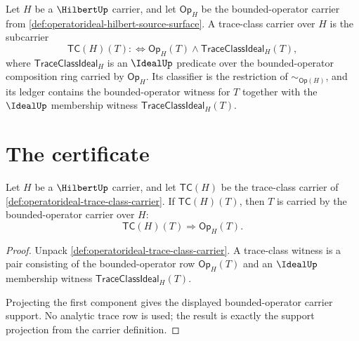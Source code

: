 \begin{definition}
\label{def:operatorideal-trace-class-carrier}
Let $H$ be a $\HilbertUp$ carrier, and let $\mathsf{Op}_H$ be the bounded-operator carrier from \autoref{def:operatorideal-hilbert-source-surface}. A trace-class carrier over $H$ is the subcarrier
$$
\mathsf{TC}(H)(T)
:\Longleftrightarrow
\mathsf{Op}_H(T)\land \mathsf{TraceClassIdeal}_H(T),
$$
where $\mathsf{TraceClassIdeal}_H$ is an $\IdealUp$ predicate over the bounded-operator composition ring carried by $\mathsf{Op}_H$. Its classifier is the restriction of $\sim_{\mathsf{Op}(H)}$, and its ledger contains the bounded-operator witness for $T$ together with the $\IdealUp$ membership witness $\mathsf{TraceClassIdeal}_H(T)$.
\end{definition}

\section{The certificate}
\label{sec:operatorideal-certificate}

\begin{theorem}
\label{thm:operatorideal-carrier-support-row}
Let $H$ be a $\HilbertUp$ carrier, and let $\mathsf{TC}(H)$ be the trace-class carrier of \autoref{def:operatorideal-trace-class-carrier}. If $\mathsf{TC}(H)(T)$, then $T$ is carried by the bounded-operator carrier over $H$:
$$
\mathsf{TC}(H)(T)\Longrightarrow \mathsf{Op}_H(T).
$$
\end{theorem}
\begin{proof}
Unpack \autoref{def:operatorideal-trace-class-carrier}. A trace-class witness is a pair consisting of the bounded-operator row $\mathsf{Op}_H(T)$ and an $\IdealUp$ membership witness $\mathsf{TraceClassIdeal}_H(T)$.

Projecting the first component gives the displayed bounded-operator carrier support. No analytic trace row is used; the result is exactly the support projection from the carrier definition.
\end{proof}

